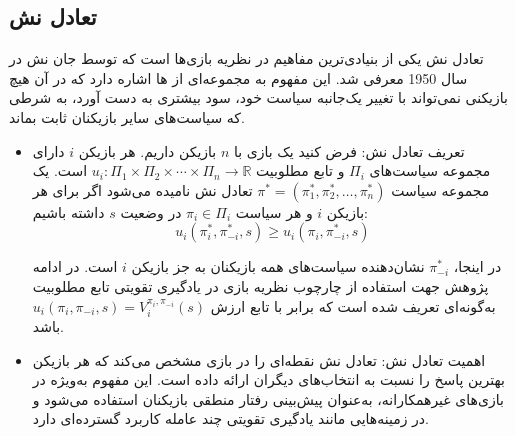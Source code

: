 \subsection{تعادل نش}
تعادل نش
 یکی از بنیادی‌ترین مفاهیم در نظریه بازی‌ها است که توسط جان نش در سال 1950 معرفی شد. این مفهوم به مجموعه‌ای از ‌ها اشاره دارد که در آن هیچ بازیکنی نمی‌تواند با تغییر یک‌جانبه سیاست خود، سود بیشتری به دست آورد، به شرطی که سیاست‌های سایر بازیکنان ثابت بماند.


\begin{itemize}
	\item تعریف تعادل نش:
	فرض کنید یک بازی با \( n \) بازیکن داریم. هر بازیکن \( i \) دارای مجموعه سیاست‌های \( \Pi_i \) و تابع مطلوبیت \( u_i: \Pi_1 \times \Pi_2 \times \cdots \times \Pi_n \rightarrow \mathbb{R} \) است. یک مجموعه سیاست \( \pi^* = (\pi_1^*, \pi_2^*, \ldots, \pi_n^*) \) تعادل نش نامیده می‌شود اگر برای هر بازیکن \( i \) و هر سیاست \( \pi_i \in \Pi_i \)
	 در وضعیت \(s\)
	 داشته باشیم:
\begin{equation}
		u_i(\pi_i^*, \pi_{-i}^*, s) \geq u_i(\pi_i, \pi_{-i}^*, s)
\end{equation}
	
	در اینجا، \( \pi_{-i}^* \) نشان‌دهنده سیاست‌های همه بازیکنان به جز بازیکن \( i \) است. در ادامه پژوهش جهت استفاده از چارچوب نظریه بازی در یادگیری تقویتی تابع مطلوبیت به‌گونه‌ای تعریف شده است که برابر با تابع ارزش
	\(u_i(\pi_i, \pi_{-i}, s)
	= V_i^{\pi_i, \pi_{-i}}(s)\)
	 باشد.
	
	\item اهمیت تعادل نش:
	تعادل نش نقطه‌ای را در بازی مشخص می‌کند که هر بازیکن بهترین پاسخ را نسبت به انتخاب‌های دیگران ارائه داده است. این مفهوم به‌ویژه در بازی‌های غیرهمکارانه، به‌عنوان پیش‌بینی رفتار منطقی بازیکنان استفاده می‌شود و در زمینه‌هایی مانند یادگیری تقویتی چند عامله کاربرد گسترده‌ای دارد.
\end{itemize}



